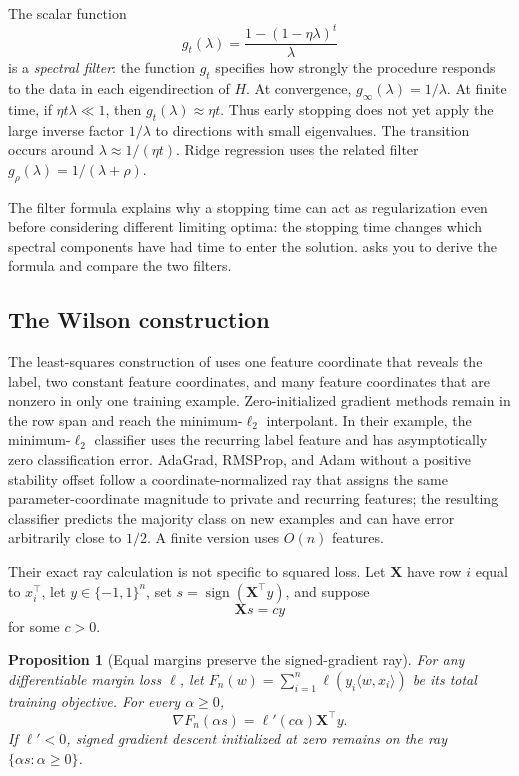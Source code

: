 \documentclass[11pt,twoside]{article}
\newcommand{\sign}{\operatorname{sign}}
\newtheorem{proposition}[theorem]{Proposition}
\theoremstyle{definition}
\theoremstyle{remark}
\begin{document}
The scalar function
\[
 g_t(\lambda)=\frac{1-(1-\eta\lambda)^t}{\lambda}
\]
is a \emph{spectral filter}: the function $g_t$ specifies how strongly the
procedure responds to the data in each eigendirection of $H$. At convergence,
$g_\infty(\lambda)=1/\lambda$. At finite time, if
$\eta t\lambda\ll1$, then $g_t(\lambda)\approx\eta t$. Thus early stopping
does not yet apply the large inverse factor $1/\lambda$ to directions with
small eigenvalues. The transition occurs around
$\lambda\approx1/(\eta t)$. Ridge regression uses the related filter
$g_\rho(\lambda)=1/(\lambda+\rho)$.

The filter formula explains why a stopping time can act as regularization even
before considering different limiting optima: the stopping time changes which
spectral components have had time to enter the solution.
 asks you to derive
the formula and compare the two filters.

\subsection{The Wilson construction}
\label{sec:wilson}

The least-squares construction of \citet{wilson2017} uses one feature
coordinate that reveals the label, two constant feature coordinates, and many
feature coordinates that are nonzero in only one training example.
Zero-initialized gradient methods remain
in the row span and reach the minimum-$\ell_2$ interpolant. In their example,
the minimum-$\ell_2$ classifier uses the recurring label feature and has
asymptotically zero classification error. AdaGrad, RMSProp, and Adam without
a positive stability offset follow a coordinate-normalized ray that assigns
the same parameter-coordinate magnitude to private and recurring features;
the resulting
classifier predicts the majority class on new examples and can have error
arbitrarily close to $1/2$. A finite version uses $O(n)$ features.

Their exact ray calculation is not specific to squared loss. Let
$\mathbf X$ have row $i$ equal to $x_i^\top$, let $y\in\{-1,1\}^n$, set
$s=\sign(\mathbf X^\top y)$, and suppose
\begin{equation}
 \mathbf Xs=cy
 \label{eq:equal-margin-ray}
\end{equation}
for some $c>0$.

\begin{proposition}[Equal margins preserve the signed-gradient ray]
\label{prop:equal-margin-ray}
For any differentiable margin loss $\ell$, let
$F_n(w)=\sum_{i=1}^n\ell(y_i\langle w,x_i\rangle)$ be its total training
objective. For every $\alpha\ge0$,
\[
 \nabla F_n(\alpha s)=\ell'(c\alpha)\mathbf X^\top y.
\]
If $\ell'<0$, signed gradient descent initialized at zero remains on the ray
$\{\alpha s:\alpha\ge0\}$.
\end{proposition}
\end{document}
